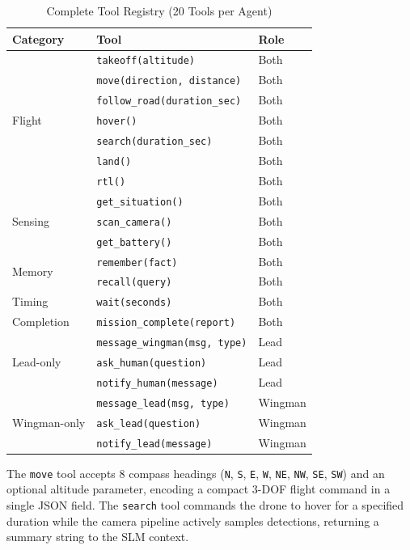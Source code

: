 \documentclass[conference]{IEEEtran}
\begin{document}
\begin{table}[htbp]
\caption{Complete Tool Registry (20 Tools per Agent)}
\label{tab:tools}
\centering
\begin{tabular}{@{}lp{3.2cm}p{1.4cm}@{}}
\toprule
\textbf{Category} & \textbf{Tool} & \textbf{Role} \\
\midrule
\multirow{7}{*}{Flight} & \texttt{takeoff(altitude)} & Both \\
 & \texttt{move(direction, distance)} & Both \\
 & \texttt{follow\_road(duration\_sec)} & Both \\
 & \texttt{hover()} & Both \\
 & \texttt{search(duration\_sec)} & Both \\
 & \texttt{land()} & Both \\
 & \texttt{rtl()} & Both \\
\midrule
\multirow{3}{*}{Sensing} & \texttt{get\_situation()} & Both \\
 & \texttt{scan\_camera()} & Both \\
 & \texttt{get\_battery()} & Both \\
\midrule
\multirow{2}{*}{Memory} & \texttt{remember(fact)} & Both \\
 & \texttt{recall(query)} & Both \\
\midrule
Timing & \texttt{wait(seconds)} & Both \\
Completion & \texttt{mission\_complete(report)} & Both \\
\midrule
\multirow{3}{*}{Lead-only} & \texttt{message\_wingman(msg, type)} & Lead \\
 & \texttt{ask\_human(question)} & Lead \\
 & \texttt{notify\_human(message)} & Lead \\
\midrule
\multirow{3}{*}{Wingman-only} & \texttt{message\_lead(msg, type)} & Wingman \\
 & \texttt{ask\_lead(question)} & Wingman \\
 & \texttt{notify\_lead(message)} & Wingman \\
\bottomrule
\end{tabular}
\end{table}

The \texttt{move} tool accepts 8 compass headings (\texttt{N}, \texttt{S}, \texttt{E}, \texttt{W}, \texttt{NE}, \texttt{NW}, \texttt{SE}, \texttt{SW}) and an optional altitude parameter, encoding a compact 3-DOF flight command in a single JSON field. The \texttt{search} tool commands the drone to hover for a specified duration while the camera pipeline actively samples detections, returning a summary string to the SLM context.
\end{document}
